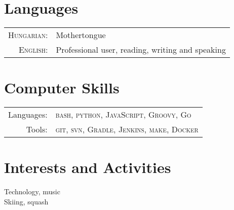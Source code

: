 \documentclass[a4paper,10pt]{article} %
\begin{document}
\section{Languages}
\begin{tabular}{rl}
\textsc{Hungarian:} & Mothertongue\\
\textsc{English:} &  Professional user, reading, writing and speaking\\
\end{tabular}

\section{Computer Skills}
\begin{tabular}{rl}
Languages: & \textsc{bash}, \textsc{python}, \textsc{JavaScript}, \textsc{Groovy}, \textsc{Go} \\
Tools: &  \textsc{git}, \textsc{svn}, \textsc{Gradle}, \textsc{Jenkins}, \textsc{make}, \textsc{Docker}
\end{tabular}

\section{Interests and Activities}
Technology, music \\
Skiing, squash
\end{document}

